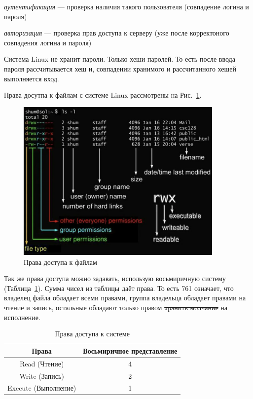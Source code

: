 \documentclass[oneside, final, 14pt]{extreport} %
\begin{document}
\textit{аутентификация} --- проверка наличия такого пользователя (совпадение логина и пароля)

\textit{авторизация} --- проверка прав доступа к серверу (уже после корректоного совпадения логина и пароля)

Система Linux не хранит пароли. Только хеши паролей. То есть после ввода пароля рассчитывается хеш и, совпадении хранимого и рассчитанного хешей выполняется вход.


Права досутпа к файлам с системе Linux рассмотрены на Рис.~\ref{fig:7}.
\begin{figure}[ht]
    \centering
    \includegraphics[width=0.9\textwidth]{7.png}
    \caption{Права доступа к файлам}
    \label{fig:7}
\end{figure}

Так же права доступа можно задавать, использую восьмиричную систему (Таблица~\ref{table:1}).
Сумма чисел из таблицы даёт права. То есть 761 означает, что владелец файла обладает всеми 
правами, группа владельца обладает правами на чтение и запись, остальные обладают только 
правом \sout{хранить молчание} на исполнение.



\begin{table}[h]
    \centering
    \begin{tabular}{|c|c|}
    \hline
    Права & Восьмиричное представление\\ 
    \hline
    Read (Чтение) & 4 \\ 
    \hline
    Write (Запись) & 2 \\
    \hline
    Execute (Выполнение) & 1 \\
    \hline
    \end{tabular}
    \caption{Права доступа к системе}
    \label{table:1}
\end{table}
\end{document}
